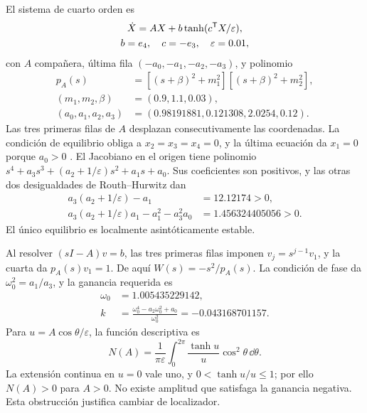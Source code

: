 El sistema de cuarto orden es
\begin{equation}
 \begin{gathered}
 \dot X=AX+b\tanh(c^{\mathsf T}X/\varepsilon),\\
 b=e_4,\quad c=-e_3,\quad\varepsilon=0.01,
 \end{gathered}
 \label{bre:res:kalman-field}
\end{equation}
con \(A\) compañera, última fila \((-a_0,-a_1,-a_2,-a_3)\), y polinomio
\[
 \begin{aligned}
 p_A(s)&=[(s+\beta)^2+m_1^2][(s+\beta)^2+m_2^2],\\
 (m_1,m_2,\beta)&=(0.9,1.1,0.03),\\
 (a_0,a_1,a_2,a_3)&=(0.98191881,0.121308,2.0254,0.12).
 \end{aligned}
\]
Las tres primeras filas de \(A\) desplazan consecutivamente las
coordenadas. La condición de equilibrio obliga a \(x_2=x_3=x_4=0\), y
la última ecuación da \(x_1=0\) porque \(a_0>0\)
\cite{kalman2019}. El Jacobiano en el origen tiene polinomio
\(s^4+a_3s^3+(a_2+1/\varepsilon)s^2+a_1s+a_0\). Sus coeficientes son
positivos, y las otras dos desigualdades de Routh--Hurwitz dan
\[
 \begin{aligned}
 a_3(a_2+1/\varepsilon)-a_1&=12.12174>0,\\
 a_3(a_2+1/\varepsilon)a_1-a_1^2-a_3^2a_0
 &=1.456324405056>0.
 \end{aligned}
\]
El único equilibrio es localmente asintóticamente estable.

Al resolver \((sI-A)v=b\), las tres primeras filas imponen
\(v_j=s^{j-1}v_1\), y la cuarta da \(p_A(s)v_1=1\). De aquí
\(W(s)=-s^2/p_A(s)\). La condición de fase da
\(\omega_0^2=a_1/a_3\), y la ganancia requerida es
\[
 \begin{aligned}
 \omega_0&=1.005435229142,\\
 k&=\frac{\omega_0^4-a_2\omega_0^2+a_0}{\omega_0^2}
   =-0.043168701157.
 \end{aligned}
\]
Para \(u=A\cos\theta/\varepsilon\), la función descriptiva es
\[
 N(A)=\frac1{\pi\varepsilon}\int_0^{2\pi}
         \frac{\tanh u}{u}\cos^2\theta\,\dd\theta.
\]
La extensión continua en \(u=0\) vale uno, y
\(0<\tanh u/u\leq1\); por ello \(N(A)>0\) para \(A>0\).
No existe amplitud que satisfaga la ganancia negativa. Esta obstrucción
justifica cambiar de localizador.

